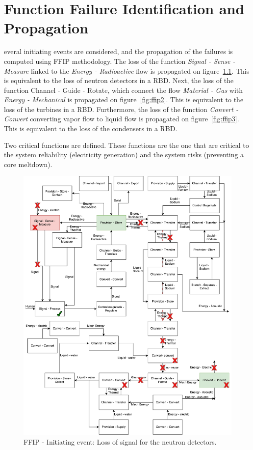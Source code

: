 %
%

\chapter{Function Failure Identification and Propagation}
\label{app:app04}

everal initiating events are considered, and the propagation of the failures is computed using FFIP methodology. The loss of the function \textit{Signal - Sense - Measure} linked to the \textit{Energy - Radioactive} flow is propagated on figure~\ref{fig:ffip1}. This is equivalent to the loss of neutron detectors in a RBD. Next, the loss of the function {Channel - Guide - Rotate}, which connect the flow \textit{Material - Gas} with \textit{Energy - Mechanical} is propagated on figure~\ref{fig:ffip2}. This is equivalent to the loss of the turbines in a RBD. Furthermore, the loss of the function \textit{Convert - Convert} converting vapor flow to liquid flow is propagated on figure~\ref{fig:ffip3}. This is equivalent to the loss of the condensers in a RBD.

Two critical functions are defined. These functions are the one that are critical to the system reliability (electricity generation) and the system risks (preventing a core meltdown).

\begin{figure}[t]
\centering
\includegraphics[scale=.55]{fig0d/FFIP_1}
\caption{FFIP - Initiating event: Loss of signal for the neutron detectors.}
\label{fig:ffip1}
\end{figure}



